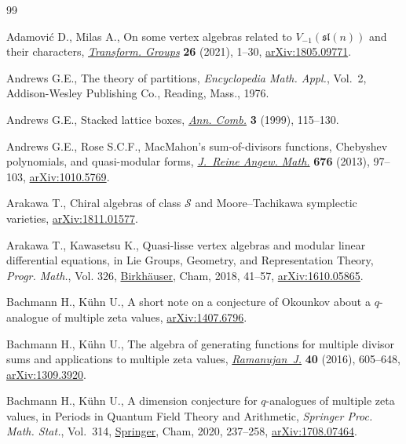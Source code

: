 \documentclass[10pt,a4paper]{amsart}
\numberwithin{equation}{section}
\theoremstyle{definition}
\begin{document}
\begin{thebibliography}{99}
\footnotesize\itemsep=0pt

Adamovi\'{c} D., Milas A., On some vertex algebras related to
 {$V_{-1}(\mathfrak{sl}(n))$} and their characters,
 \href{https://doi.org/10.1007/s00031-020-09617-w}{\textit{Transform. Groups}}
 \textbf{26} (2021), 1--30,
 \href{https://arxiv.org/abs/1805.09771}{arXiv:1805.09771}.

Andrews G.E., The theory of partitions, \textit{Encyclopedia Math. Appl.},
 Vol.~2, Addison-Wesley Publishing Co., Reading, Mass., 1976.

Andrews G.E., Stacked lattice boxes,
 \href{https://doi.org/10.1007/BF01608779}{\textit{Ann. Comb.}} \textbf{3}
 (1999), 115--130.

Andrews G.E., Rose S.C.F., Mac{M}ahon's sum-of-divisors functions, {C}hebyshev
 polynomials, and quasi-modular forms,
 \href{https://doi.org/10.1515/crelle.2011.179}{\textit{J.~Reine Angew.
 Math.}} \textbf{676} (2013), 97--103,
 \href{https://arxiv.org/abs/1010.5769}{arXiv:1010.5769}.

Arakawa T., Chiral algebras of class $\mathcal{S}$ and {M}oore--{T}achikawa
 symplectic varieties,
 \href{https://arxiv.org/abs/1811.01577}{arXiv:1811.01577}.

Arakawa T., Kawasetsu K., Quasi-lisse vertex algebras and modular linear
 differential equations, in Lie Groups, Geometry, and Representation Theory,
 \textit{Progr. Math.}, Vol. 326,
 \href{https://doi.org/10.1007/978-3-030-02191-7_2}{Birkh\"auser}, Cham, 2018,
 41--57, \href{https://arxiv.org/abs/1610.05865}{arXiv:1610.05865}.

Bachmann H., K\"uhn U., A short note on a conjecture of {O}kounkov about a
 $q$-analogue of multiple zeta values,
 \href{https://arxiv.org/abs/1407.6796}{arXiv:1407.6796}.

Bachmann H., K\"uhn U., The algebra of generating functions for multiple
 divisor sums and applications to multiple zeta values,
 \href{https://doi.org/10.1007/s11139-015-9707-7}{\textit{Ramanujan~J.}}
 \textbf{40} (2016), 605--648,
 \href{https://arxiv.org/abs/1309.3920}{arXiv:1309.3920}.

Bachmann H., K\"uhn U., A dimension conjecture for $q$-analogues of multiple
 zeta values, in Periods in Quantum Field Theory and Arithmetic,
 \textit{Springer Proc. Math. Stat.}, Vol.~314,
 \href{https://doi.org/10.1007/978-3-030-37031-2_9}{Springer}, Cham, 2020,
 237--258, \href{https://arxiv.org/abs/1708.07464}{arXiv:1708.07464}.


\end{thebibliography}
\end{document}
